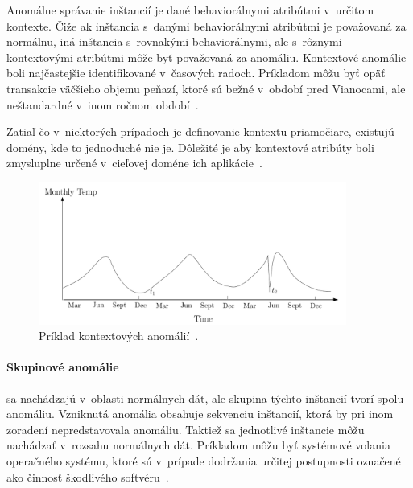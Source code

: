 \documentclass[a4paper,twoside,slovak,12pt,appendix]{article}
\begin{document}
Anomálne správanie inštancií je dané behaviorálnymi atribútmi v~určitom kontexte.
Čiže ak inštancia s~danými behaviorálnymi atribútmi je považovaná za normálnu,
iná inštancia s~rovnakými behaviorálnymi, ale s~rôznymi kontextovými atribútmi
môže byť považovaná za anomáliu. Kontextové anomálie boli najčastejšie
identifikované v~časových radoch. Príkladom môžu byť opäť transakcie väčšieho
objemu peňazí, ktoré sú bežné v~období pred Vianocami, ale neštandardné v~inom
ročnom období~\cite{Chandola2009}.

Zatiaľ čo v~niektorých prípadoch je definovanie kontextu priamočiare, existujú
domény, kde to jednoduché nie je. Dôležité je aby kontextové atribúty boli
zmysluplne určené v~cieľovej doméne ich aplikácie~\cite{Chandola2009}.

\begin{figure}[htbp]
  \centering
  \includegraphics[width=0.9\textwidth]{contextual_anomalies.png}
  \caption{Príklad kontextových anomálií~\cite{Chandola2009}.}
  \label{fig:contextual-anomalies}
\end{figure}

\paragraph{Skupinové anomálie} sa nachádzajú v~oblasti normálnych dát, ale
skupina týchto inštancií tvorí spolu anomáliu. Vzniknutá anomália obsahuje
sekvenciu inštancií, ktorá by pri inom zoradení nepredstavovala anomáliu.
Taktiež sa jednotlivé inštancie môžu nachádzať v~rozsahu normálnych dát.
Príkladom môžu byť systémové volania operačného systému, ktoré sú v~prípade
dodržania určitej postupnosti označené ako činnosť škodlivého
softvéru~\cite{Chandola2009}.
\end{document}
